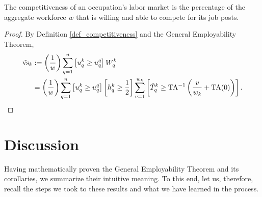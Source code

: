 \documentclass[hidelinks, nonatbib]{elsarticle}
\begin{document}
\begin{corollary}
    \label{gcc}
    The competitiveness of an occupation's labor market is the percentage of the aggregate workforce $w$ that is willing and able to compete for its job posts.

    \begin{proof}
        By Definition \ref{def_competitiveness} and the General Employability Theorem,
        \begin{align}
            \tilde{\text{vs}}_{k}
        &:=
        \left(
            \frac{1}{w}
        \right)
        \sum_{q=1}^{n}
        \left[
            u_{q}^{k}
            \geq
            u_{q}^{q}
        \right]
        W_{q}^{k}
        \\
        &=
        \left(
            \frac{1}{w}
        \right)
        \sum_{q=1}^{n}
        \left[
            u_{q}^{k}
            \geq
            u_{q}^{q}
        \right]
        \left[
            h_{q}^{k}
            \geq
            \frac{1}{2}
        \right]
        \sum_{v=1}^{w_k}
        \left[
            \tilde{T}_{q}^{k}
            \geq
            \text{TA}^{-1}
            \left(
                \frac{v}{w_k}
                +
                \text{TA}(0)
            \right)
        \right]
        .
        \end{align}
    \end{proof}
\end{corollary}



\section{Discussion}
Having mathematically proven the General Employability Theorem and its corollaries, we summarize their intuitive meaning. To this end, let us, therefore, recall the steps we took to these results and what we have learned in the process.
\end{document}
